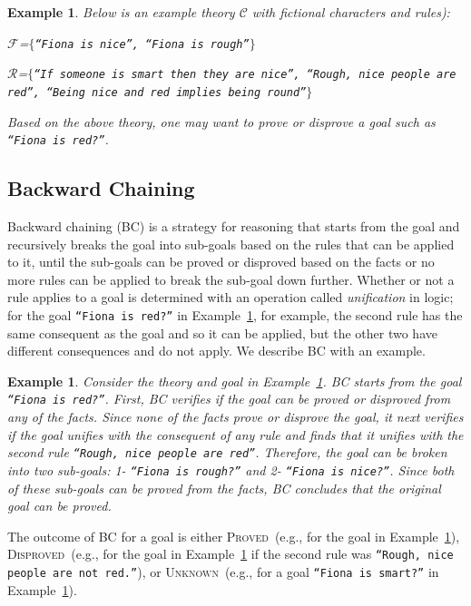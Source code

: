\documentclass[11pt]{article}
\newcommand{\theory}[1]{\ensuremath{\mathcal{#1}}}
\newcommand{\facts}[1]{\ensuremath{\mathcal{#1}}}
\newcommand{\proved}{\textsc{Proved}}
\newcommand{\disproved}{\textsc{Disproved}}
\newcommand{\unk}{\textsc{Unknown}}
\newtheorem{example}[theorem]{Example}
\begin{document}
\begin{example} \label{ex:logic}
Below is an example theory \theory{C} with fictional characters and rules):

\facts{F}=$\{$\texttt{``Fiona is nice'', ``Fiona is rough''}$\}$

\facts{R}=$\{$\texttt{``If someone is smart then they are nice'', ``Rough, nice people are red'', ``Being nice and red implies being round''}$\}$

Based on the above theory, one may want to prove or disprove a goal such as \texttt{``Fiona is red?''}.
\end{example}

\subsection{Backward Chaining}
Backward chaining (BC) is a strategy for reasoning that starts from the goal and recursively breaks the goal into sub-goals based on the rules that can be applied to it, until the sub-goals can be proved or disproved based on the facts or no more rules can be applied to break the sub-goal down further. Whether or not a rule applies to a goal is determined with an operation called \emph{unification} in logic; for the goal \texttt{``Fiona is red?''} in Example~\ref{ex:logic}, for example, the second rule has the same consequent as the goal and so it can be applied, but the other two have different consequences and do not apply. We describe BC with an example.

\begin{example} \label{ex:backward-chain}
Consider the theory and goal in Example~\ref{ex:logic}. BC starts from the goal \texttt{``Fiona is red?''}. First, BC verifies if the goal can be proved or disproved from any of the facts. Since none of the facts prove or disprove the goal, it next verifies if the goal unifies with the consequent of any rule and finds that it unifies with the second rule \texttt{``Rough, nice people are red''}. Therefore, the goal can be broken into two sub-goals: 1- \texttt{``Fiona is rough?''} and 2- \texttt{``Fiona is nice?''}. Since both of these sub-goals can be proved from the facts, BC concludes that the original goal can be proved.
\end{example}

The outcome of BC for a goal is either \proved\ (e.g., for the goal in Example~\ref{ex:backward-chain}), \disproved\ (e.g., for the goal in Example~\ref{ex:backward-chain} if the second rule was \texttt{``Rough, nice people are not red.''}), or \unk\ (e.g., for a goal \texttt{``Fiona is smart?''} in Example~\ref{ex:backward-chain}).
\end{document}
